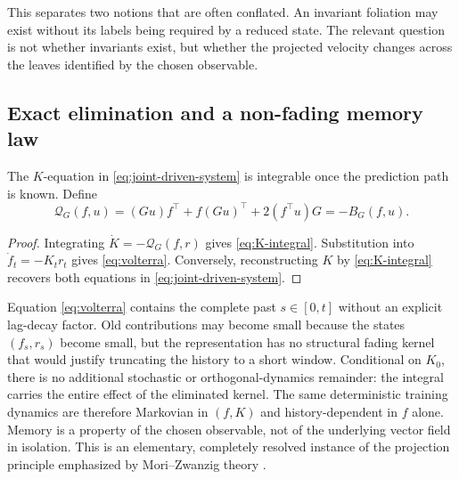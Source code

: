 This separates two notions that are often conflated.  An invariant foliation may exist without its labels being required by a reduced state.  The relevant question is not whether invariants exist, but whether the projected velocity changes across the leaves identified by the chosen observable.

\subsection{Exact elimination and a non-fading memory law}

The $K$-equation in \eqref{eq:joint-driven-system} is integrable once the prediction path is known.  Define
\begin{equation}
  \mathcal Q_G(f,u)
  =(Gu)f^\top+f(Gu)^\top+2(f^\top u)G
  =-B_G(f,u).
  \label{eq:QG}
\end{equation}


\begin{proof}
Integrating $\dot K=-\mathcal Q_G(f,r)$ gives \eqref{eq:K-integral}.  Substitution into $\dot f_t=-K_t r_t$ gives \eqref{eq:volterra}.  Conversely, reconstructing $K$ by \eqref{eq:K-integral} recovers both equations in \eqref{eq:joint-driven-system}.
\end{proof}

Equation \eqref{eq:volterra} contains the complete past $s\in[0,t]$ without an explicit lag-decay factor.  Old contributions may become small because the states $(f_s,r_s)$ become small, but the representation has no structural fading kernel that would justify truncating the history to a short window.  Conditional on $K_0$, there is no additional stochastic or orthogonal-dynamics remainder: the integral carries the entire effect of the eliminated kernel.  The same deterministic training dynamics are therefore Markovian in $(f,K)$ and history-dependent in $f$ alone.  Memory is a property of the chosen observable, not of the underlying vector field in isolation.  This is an elementary, completely resolved instance of the projection principle emphasized by Mori--Zwanzig theory \citep{zwanzig1961memory,mori1965transport,chorin2002memory}.
